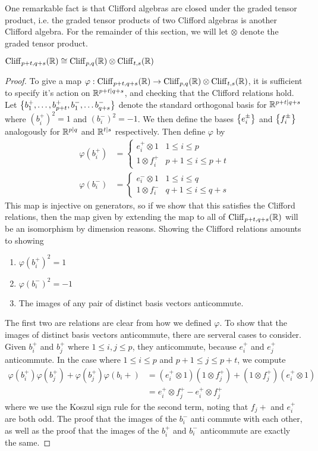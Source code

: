 One remarkable fact is that Clifford algebras are closed under the graded
tensor product, i.e. the graded tensor products of two Clifford algebras is
another Clifford algebra. For the remainder of this section,
we will let $\otimes$ denote the graded tensor product.
%
\begin{thm}
$\operatorname{Cliff}_{p+t,q+s}(\mathbb{R}) \cong \operatorname{Cliff}_{p,q}(\mathbb{R}) \otimes \operatorname{Cliff}_{t,s}(\mathbb{R})$
\end{thm}
%
\begin{proof}
To give a map $\varphi : \operatorname{Cliff}_{p+t,q+s}(\mathbb{R}) \to \operatorname{Cliff}_{p,q}(\mathbb{R}) \otimes
\operatorname{Cliff}_{t,s}(\mathbb{R})$, it is sufficient to specify it's action on $\mathbb{R}^{p+t|q+s}$, and
checking that the Clifford relations hold. Let
$\left\lbrace b_1^+,\ldots, b_{p+t}^+, b_1^-, \ldots b_{q+s}^- \right\rbrace$ denote the standard
orthogonal basis for $\mathbb{R}^{p+t|q+s}$ where $(b_i^+)^2 = 1$ and $(b_i^-)^2 = -1$.
We then define the bases $\left\lbrace e_i^\pm \right\rbrace$ and $\left\lbrace f_i^\pm \right\rbrace$ analogously for
$\mathbb{R}^{p|q}$ and $\mathbb{R}^{t|s}$ respectively. Then define $\varphi$ by
%
\begin{align*}
\varphi(b_i^+) &= \begin{cases}
e_i^+ \otimes 1 & 1 \leq i \leq p \\
1 \otimes f_i^+ & p+1 \leq i \leq p+t
\end{cases} \\
\varphi(b_i^-) &= \begin{cases}
e_i^- \otimes 1 & 1 \leq i \leq q \\
1 \otimes f_i^- & q+1 \leq i \leq q+s
\end{cases}
\end{align*}
%
This map is injective on generators, so if we show that this satisfies the
Clifford relations, then the map given by extending the map to all of
$\operatorname{Cliff}_{p+t,q+s}(\mathbb{R})$ will be an isomorphism by dimension reasons. Showing
the Clifford relations amounts to showing
%
\begin{enumerate}
  \item $\varphi(b_i^+)^2 = 1$
  \item $\varphi(b_i^-)^2 = -1$
  \item The images of any pair of distinct basis vectors anticommute.
\end{enumerate}
%
The first two are relations are clear from how we defined $\varphi$. To show
that the images of distinct basis vectors anticommute, there are serveral
cases to consider. Given $b_i^+$ and $b_j^+$ where $1 \leq i,j \leq p$, they
anticommute, because $e_i^+$ and $e_j^+$ anticommute. In the case where
$1 \leq i \leq p$ and $p+1 \leq j \leq p+t$, we compute
%
\begin{align*}
\varphi(b_i^+)\varphi(b_j^+) + \varphi(b_j^+)\varphi(b_i+) &=
(e_i^+ \otimes 1)(1 \otimes f_j^+) + (1\otimes f_j^+)(e_i^+ \otimes 1) \\
&= e_i^+ \otimes f_j^+ - e_i^+ \otimes f_j^+
\end{align*}
where we use the Koszul sign rule for the second term, noting that $f_j+$ and
$e_i^+$ are both odd. The proof that the images of the $b_i^-$ anti commute with
each other, as well as the proof that the images of the $b_i^+$ and $b_i^-$
anticommute are exactly the same.
%
\end{proof}
